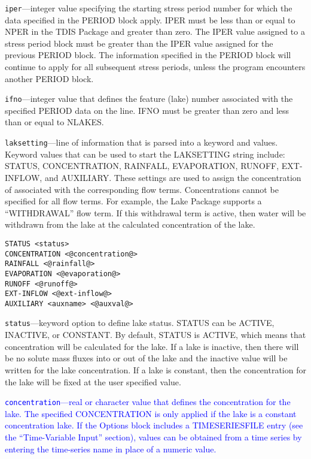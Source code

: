 \begin{description}
\item \texttt{iper}---integer value specifying the starting stress period number for which the data specified in the PERIOD block apply.  IPER must be less than or equal to NPER in the TDIS Package and greater than zero.  The IPER value assigned to a stress period block must be greater than the IPER value assigned for the previous PERIOD block.  The information specified in the PERIOD block will continue to apply for all subsequent stress periods, unless the program encounters another PERIOD block.

\item \texttt{ifno}---integer value that defines the feature (lake) number associated with the specified PERIOD data on the line. IFNO must be greater than zero and less than or equal to NLAKES.

\item \texttt{laksetting}---line of information that is parsed into a keyword and values.  Keyword values that can be used to start the LAKSETTING string include: STATUS, CONCENTRATION, RAINFALL, EVAPORATION, RUNOFF, EXT-INFLOW, and AUXILIARY.  These settings are used to assign the concentration of associated with the corresponding flow terms.  Concentrations cannot be specified for all flow terms.  For example, the Lake Package supports a ``WITHDRAWAL'' flow term.  If this withdrawal term is active, then water will be withdrawn from the lake at the calculated concentration of the lake.

\begin{lstlisting}[style=blockdefinition]
STATUS <status>
CONCENTRATION <@concentration@>
RAINFALL <@rainfall@>
EVAPORATION <@evaporation@>
RUNOFF <@runoff@>
EXT-INFLOW <@ext-inflow@>
AUXILIARY <auxname> <@auxval@> 
\end{lstlisting}

\item \texttt{status}---keyword option to define lake status.  STATUS can be ACTIVE, INACTIVE, or CONSTANT. By default, STATUS is ACTIVE, which means that concentration will be calculated for the lake.  If a lake is inactive, then there will be no solute mass fluxes into or out of the lake and the inactive value will be written for the lake concentration.  If a lake is constant, then the concentration for the lake will be fixed at the user specified value.

\item \textcolor{blue}{\texttt{concentration}---real or character value that defines the concentration for the lake. The specified CONCENTRATION is only applied if the lake is a constant concentration lake. If the Options block includes a TIMESERIESFILE entry (see the ``Time-Variable Input'' section), values can be obtained from a time series by entering the time-series name in place of a numeric value.}


\end{description}
